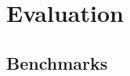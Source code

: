 \chapter{Evaluation} \label{evalandtesting}


\cite{komathukattil_evaluating_nodate}
\section{Benchmarks}

